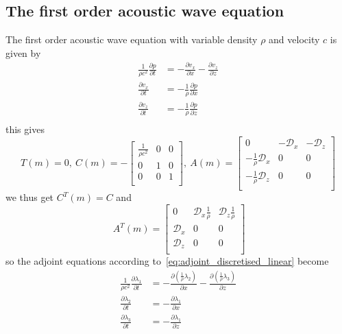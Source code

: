 \documentclass[fleqn,11pt]{SelfArx} %
\newcommand{\pder}[2][]{\frac{\partial#1}{\partial#2}}
\theoremstyle{definition}
\begin{document}
\subsection{The first order acoustic wave equation}
The first order acoustic wave equation with variable density $\rho$ and velocity $c$ is given by
\begin{equation}
\label{eq:acoustic_first_order_wave_equation}
\begin{aligned}
\frac{1}{\rho c^2}\pder[p]{t} & = -\pder[v_x]{x} - \pder[v_z]{z} \\
 \pder[v_x]{t} & =-\frac{1}{\rho} \pder[p]{x} \\
 \pder[v_z]{t} & =-\frac{1}{\rho} \pder[p]{z} \\
\end{aligned}
\end{equation}
this gives 
\begin{equation}
T(m) = 0, \ C(m) = -
\begin{bmatrix}
\frac{1}{\rho c^2} &0& 0 \\
0&1&0\\
0&0&1\\
\end{bmatrix},
\ A(m) = \begin{bmatrix}
0 &-\mathcal{D}_x& -\mathcal{D}_z \\
-\frac{1}{\rho}\mathcal{D}_x&0&0\\
-\frac{1}{\rho}\mathcal{D}_z&0&0\\
\end{bmatrix}
\end{equation}
we thus get $C^T(m) = C$ and
\begin{equation}
\ A^T(m) = \begin{bmatrix}
0 &\mathcal{D}_x\frac{1}{\rho}& \mathcal{D}_z\frac{1}{\rho} \\
\mathcal{D}_x&0&0\\
\mathcal{D}_z&0&0\\
\end{bmatrix}
\end{equation}
so the adjoint equations according to~\cref{eq:adjoint_discretised_linear} become
\begin{equation}\label{eq:adjoint_acoustic_first_order}
\begin{aligned}
\frac{1}{\rho c^2}\pder[\lambda_1]{t} & = -\pder[\left(\frac{1}{\rho}\lambda_2\right)]{x} - \pder[\left(\frac{1}{\rho}\lambda_3\right)]{z} \\
 \pder[\lambda_2]{t} & =- \pder[\lambda_1]{x} \\
 \pder[\lambda_3]{t} & =-\pder[\lambda_1]{z} \\
\end{aligned}
\end{equation}
\end{document}
